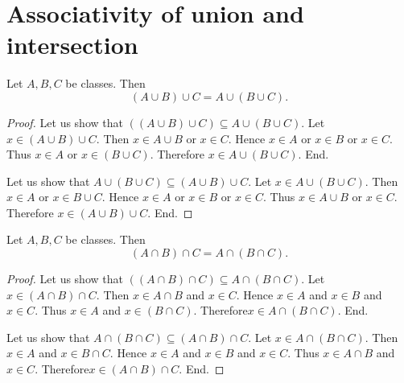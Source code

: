 \documentclass[../set-theory.tex]{subfiles}
\begin{document}
  \section*{Associativity of union and intersection}

  \begin{forthel}
    \begin{proposition}
      Let $A, B, C$ be classes.
      Then \[ (A \cup B) \cup C = A \cup (B \cup C). \]
    \end{proposition}
    \begin{proof}
      Let us show that $((A \cup B) \cup C) \subseteq A \cup (B \cup C)$. %
        Let $x \in (A \cup B) \cup C$.
        Then $x \in A \cup B$ or $x \in C$.
        Hence $x \in A$ or $x \in B$ or $x \in C$.
        Thus $x \in A$ or $x \in (B \cup C)$.
        Therefore $x \in A \cup (B \cup C)$.
      End.

      Let us show that $A \cup (B \cup C) \subseteq (A \cup B) \cup C$.
        Let $x \in A \cup (B \cup C)$.
        Then $x \in A$ or $x \in B \cup C$.
        Hence $x \in A$ or $x \in B$ or $x \in C$.
        Thus $x \in A \cup B$ or $x \in C$.
        Therefore $x \in (A \cup B) \cup C$.
      End.
    \end{proof}
  \end{forthel}

  \begin{forthel}
    \begin{proposition}
      Let $A, B, C$ be classes.
      Then \[ (A \cap B) \cap C = A \cap (B \cap C). \]
    \end{proposition}
    \begin{proof}
      Let us show that $((A \cap B) \cap C) \subseteq A \cap (B \cap C)$. %
        Let $x \in (A \cap B) \cap C$.
        Then $x \in A \cap B$ and $x \in C$.
        Hence $x \in A$ and $x \in B$ and $x \in C$.
        Thus $x \in A$ and $x \in (B \cap C)$.
        Therefore$ x \in A \cap (B \cap C)$.
      End.

      Let us show that $A \cap (B \cap C) \subseteq (A \cap B) \cap C$.
        Let $x \in A \cap (B \cap C)$.
        Then $x \in A$ and $x \in B \cap C$.
        Hence $x \in A$ and $x \in B$ and $x \in C$.
        Thus $x \in A \cap B$ and $x \in C$.
        Therefore$ x \in (A \cap B) \cap C$.
      End.
    \end{proof}
  \end{forthel}
\end{document}
